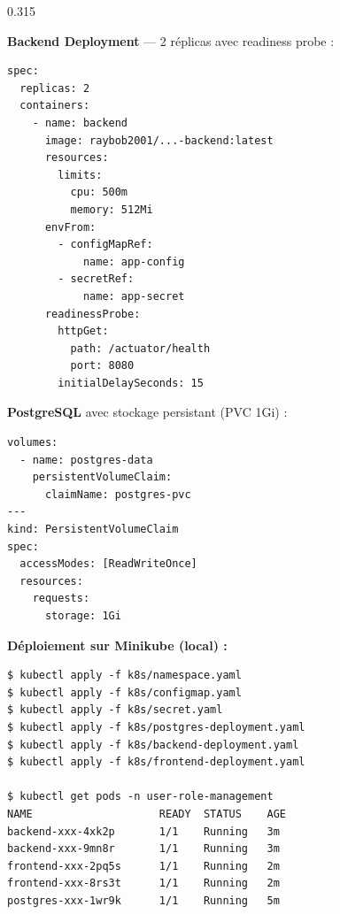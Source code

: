 \documentclass[final]{beamer}
\begin{document}
\begin{frame}[t]{}
\begin{columns}[t]
\begin{column}{0.315\linewidth}
\begin{tcolorbox}[sectionbox, title={\faDocker\quad Conteneurisation Docker}]
\end{tcolorbox}

\begin{tcolorbox}[sectionbox, title={\faServer\quad Orchestration Kubernetes}]

\textbf{Backend Deployment} — 2 réplicas avec readiness probe :
\begin{tcolorbox}[codebox]
\begin{lstlisting}
spec:
  replicas: 2
  containers:
    - name: backend
      image: raybob2001/...-backend:latest
      resources:
        limits:
          cpu: 500m
          memory: 512Mi
      envFrom:
        - configMapRef:
            name: app-config
        - secretRef:
            name: app-secret
      readinessProbe:
        httpGet:
          path: /actuator/health
          port: 8080
        initialDelaySeconds: 15
\end{lstlisting}
\end{tcolorbox}

\vspace{6pt}
\textbf{PostgreSQL} avec stockage persistant (PVC 1Gi) :
\begin{tcolorbox}[codebox]
\begin{lstlisting}
volumes:
  - name: postgres-data
    persistentVolumeClaim:
      claimName: postgres-pvc
---
kind: PersistentVolumeClaim
spec:
  accessModes: [ReadWriteOnce]
  resources:
    requests:
      storage: 1Gi
\end{lstlisting}
\end{tcolorbox}

\vspace{6pt}
\textbf{Déploiement sur Minikube (local) :}
\begin{tcolorbox}[codebox]
\begin{lstlisting}
$ kubectl apply -f k8s/namespace.yaml
$ kubectl apply -f k8s/configmap.yaml
$ kubectl apply -f k8s/secret.yaml
$ kubectl apply -f k8s/postgres-deployment.yaml
$ kubectl apply -f k8s/backend-deployment.yaml
$ kubectl apply -f k8s/frontend-deployment.yaml

$ kubectl get pods -n user-role-management
NAME                    READY  STATUS    AGE
backend-xxx-4xk2p       1/1    Running   3m
backend-xxx-9mn8r       1/1    Running   3m
frontend-xxx-2pq5s      1/1    Running   2m
frontend-xxx-8rs3t      1/1    Running   2m
postgres-xxx-1wr9k      1/1    Running   5m
\end{lstlisting}
\end{tcolorbox}


\end{tcolorbox}
\end{column}
\end{columns}
\end{frame}
\end{document}
